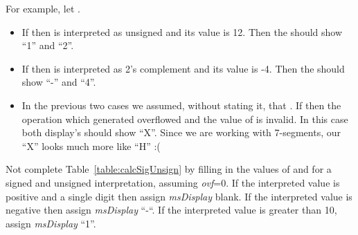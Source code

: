 For example, let .
\begin{itemize}
    \item
        If  then
         is interpreted as unsigned and its value is 12. Then
        the  should show ``1'' and  ``2''.

    \item
        If  then
         is interpreted as 2's complement and its value is -4. Then
        the  should show ``-'' and  ``4''.

    \item
        In the previous two cases we assumed, without stating it, that .
        If  then the operation which generated  overflowed
        and the value of  is invalid.  In this case both display's should show ``X''.
        Since we are working with 7-segments, our ``X'' looks much more like ``H'' :(
    \end{itemize}

    Not complete Table~\ref{table:calcSigUnsign} by filling in the values of  and
     for a signed and unsigned interpretation, assuming
    \emph{ovf}=0. If the interpreted value is
    positive and a single digit then assign \emph{msDisplay} blank. If the
    interpreted value is negative then assign \emph{msDisplay} ``-``. If the
    interpreted value is greater than 10, assign \emph{msDisplay} ``1''.

